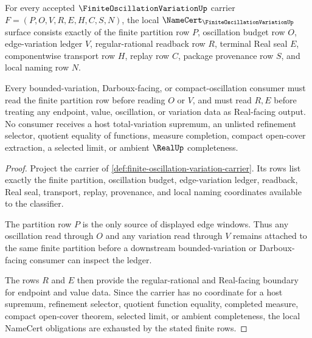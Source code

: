 \begin{theorem}
\label{thm:finite-oscillation-variation-namecert-obligations}
For every accepted $\FiniteOscillationVariationUp$ carrier $F=(P,O,V,R,E,H,C,S,N)$, the local $\NameCert_{\FiniteOscillationVariationUp}$ surface consists exactly of the finite partition row $P$, oscillation budget row $O$, edge-variation ledger $V$, regular-rational readback row $R$, terminal Real seal $E$, componentwise transport row $H$, replay row $C$, package provenance row $S$, and local naming row $N$.

Every bounded-variation, Darboux-facing, or compact-oscillation consumer must read the finite partition row before reading $O$ or $V$, and must read $R,E$ before treating any endpoint, value, oscillation, or variation data as Real-facing output. No consumer receives a host total-variation supremum, an unlisted refinement selector, quotient equality of functions, measure completion, compact open-cover extraction, a selected limit, or ambient $\RealUp$ completeness.
\end{theorem}
\begin{proof}
Project the carrier of \autoref{def:finite-oscillation-variation-carrier}. Its rows list exactly the finite partition, oscillation budget, edge-variation ledger, readback, Real seal, transport, replay, provenance, and local naming coordinates available to the classifier.

The partition row $P$ is the only source of displayed edge windows. Thus any oscillation read through $O$ and any variation read through $V$ remains attached to the same finite partition before a downstream bounded-variation or Darboux-facing consumer can inspect the ledger.

The rows $R$ and $E$ then provide the regular-rational and Real-facing boundary for endpoint and value data. Since the carrier has no coordinate for a host supremum, refinement selector, quotient function equality, completed measure, compact open-cover theorem, selected limit, or ambient completeness, the local NameCert obligations are exhausted by the stated finite rows.
\end{proof}


